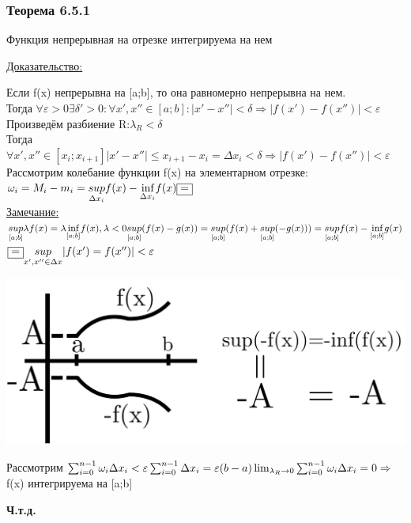 \documentclass[12pt]{article}
\let\ORIincludegraphics\includegraphics
\renewcommand{\includegraphics}[2][]{\ORIincludegraphics[scale=0.65,#1]{#2}}
\begin{document}
    \subsubsection*{Теорема 6.5.1 }\label{th:6.5.1}
    Функция непрерывная на отрезке интегрируема на нем \par\noindent
    \underline{Доказательство:}
    \begin{adjustwidth}{1.5em}{1.5em}
        Если f(x) непрерывна на [a;b], то она равномерно непрерывна на нем.\\
        Тогда $\forall \varepsilon>0 \exists \delta'>0:\forall x',x'' \in [a;b]: |x'-x''|<\delta \Rightarrow |f(x')-f(x'')|<\varepsilon$\\
        Произведём разбиение R:$\lambda_R < \delta$\\
        Тогда $\forall x',x'' \in [x_i;x_{i+1}]|x'-x''|\leq x_{i+1}-x_i=\Delta x_i < \delta \Rightarrow |f(x')-f(x'')|<\varepsilon$\\
        Рассмотрим колебание функции f(x) на элементарном отрезке: $\omega_i=M_i-m_i = \underset{\Delta x_i}{sup}f(x)-\underset{\Delta x_i}{\text{inf}}f(x) \fbox{=}$\\
        \underline{Замечание:}
        \begin{math}
            \underset{[a;b]}{sup} \lambda f(x) = \lambda \underset{[a;b]}{\text{inf}} f(x),\lambda < 0\\
            \underset{[a;b]}{sup}(f(x)-g(x))=\underset{[a;b]}{sup} (f(x)+\underset{[a;b]}{sup} (-g(x))) = \underset{[a;b]}{sup} f(x)-\underset{[a;b]}{\text{inf}} g(x)\\
        \end{math}
        $\fbox{=} \underset{x',x'' \in \Delta x}{sup}|f(x')=f(x'')|<\varepsilon$\\
        \begin{center}
            \includegraphics[width=0.6\linewidth]{6.5.1.png}\\
        \end{center}
        Рассмотрим $\sum_{i=0}^{n-1} \omega_i \Delta x_i < \varepsilon \sum_{i=0}^{n-1} \Delta x_i = \varepsilon (b-a)\\
        \lim_{\lambda_R \to 0} \sum_{i=0}^{n-1} \omega_i \Delta x_i = 0 \Rightarrow$ f(x) интегрируема на [a;b]\\
        \begin{center}
            \textbf{Ч.т.д.}
        \end{center}
    \end{adjustwidth}
\end{document}
